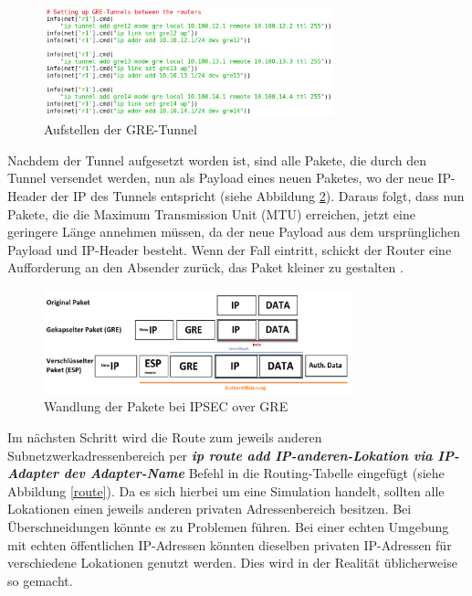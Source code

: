 \documentclass[fontsize=12pt,paper=a4,open=any,parskip=half,
  twoside=false,toc=listof,toc=bibliography,fleqn,leqno,
  captions=nooneline,captions=tableabove,british]{scrbook}
\begin{document}
\begin{figure}[H]
 \centering
 \includegraphics[width=0.75\textwidth]{Bilder/gre}
 \captionsetup{justification=centering,margin=2cm}
 \caption{Aufstellen der GRE-Tunnel}
 \label{gre}
\end{figure}

Nachdem der Tunnel aufgesetzt worden ist, sind alle Pakete, die durch den Tunnel versendet werden, nun als Payload eines neuen Paketes, wo der neue IP-Header der IP des Tunnels entspricht \cite{newpayload} (siehe Abbildung \ref{ipsecgre}). Daraus folgt, dass nun Pakete, die die Maximum Transmission Unit (MTU) erreichen, jetzt eine geringere Länge annehmen müssen, da der neue Payload aus dem ursprünglichen Payload und IP-Header besteht. Wenn der Fall eintritt, schickt der Router eine Aufforderung an den Absender zurück, das Paket kleiner zu gestalten \cite{MTU}.

\begin{figure}[H]
	\centering
	\includegraphics[width=0.8\textwidth]{Bilder/ipsecgre}
	\captionsetup{justification=centering,margin=2cm}
	\caption{Wandlung der Pakete bei IPSEC over GRE}
	\label{ipsecgre}
\end{figure}

Im nächsten Schritt wird die Route zum jeweils anderen Subnetzwerkadressenbereich per \textit{\textbf{ip route add IP-anderen-Lokation via IP-Adapter dev Adapter-Name}} Befehl in die Routing-Tabelle eingefügt \cite{addroute} (siehe Abbildung \ref{route}). Da es sich hierbei um eine Simulation handelt, sollten alle Lokationen einen jeweils anderen privaten Adressenbereich besitzen. Bei Überschneidungen könnte es zu Problemen führen. Bei einer echten Umgebung mit echten öffentlichen IP-Adressen könnten dieselben privaten IP-Adressen für verschiedene Lokationen genutzt werden. Dies wird in der Realität üblicherweise so gemacht.
\end{document}
